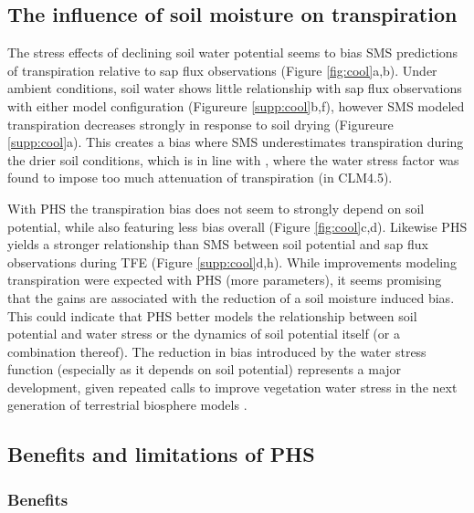\documentclass[draft,linenumbers]{agujournal}
\begin{document}
\subsection{The influence of soil moisture on transpiration}
    \label{sect:smt}
    The stress effects of declining soil water potential seems to bias SMS predictions of transpiration relative to sap flux observations (Figure \ref{fig:cool}a,b).
    Under ambient conditions, soil water shows little relationship with sap flux observations with either model configuration (Figureure \ref{supp:cool}b,f),
    however SMS modeled transpiration decreases strongly in response to soil drying (Figureure \ref{supp:cool}a).
    This creates a bias where SMS underestimates transpiration during the drier soil conditions, 
    which is in line with \cite{bonan2014}, where the water stress factor was found to impose too much attenuation of transpiration (in CLM4.5).
    
    With PHS the transpiration bias does not seem to strongly depend on soil potential, while also featuring less bias overall (Figure \ref{fig:cool}c,d).
    Likewise PHS yields a stronger relationship than SMS between soil potential and sap flux observations during TFE (Figure \ref{supp:cool}d,h).
    While improvements modeling transpiration were expected with PHS (more parameters), it seems promising that the gains are associated with the reduction of a soil moisture induced bias.
    This could indicate that PHS better models the relationship between soil potential and water stress or the dynamics of soil potential itself (or a combination thereof).
    The reduction in bias introduced by the water stress function (especially as it depends on soil potential) represents a major development, given repeated calls to improve vegetation water stress in the next generation of terrestrial biosphere models \citep{powell2013,rogers2017,trugman2018}.

\subsection{Benefits and limitations of PHS}

\subsubsection{Benefits}
\end{document}
